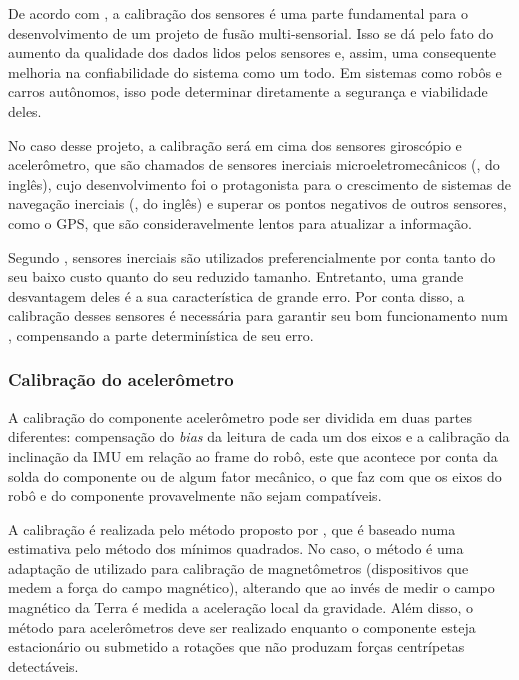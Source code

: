 \documentclass[acronym, symbols, table]{fei}
\begin{document}
		De acordo com \textcite{lv2020targetless}, a calibração dos sensores é uma parte fundamental para o desenvolvimento de um projeto de fusão multi-sensorial. Isso se dá pelo fato do aumento da qualidade dos dados lidos pelos sensores e, assim, uma consequente melhoria na confiabilidade do sistema como um todo. Em sistemas como robôs e carros autônomos, isso pode determinar diretamente a segurança e viabilidade deles.
		
		No caso desse projeto, a calibração será em cima dos sensores giroscópio e acelerômetro, que são chamados de sensores inerciais microeletromecânicos (, do inglês), cujo desenvolvimento foi o protagonista para o crescimento de sistemas de navegação inerciais (, do inglês) e superar os pontos negativos de outros sensores, como o GPS, que são consideravelmente lentos para atualizar a informação.
		
		Segundo \textcite{9181212}, sensores inerciais  são utilizados preferencialmente por conta tanto do seu baixo custo quanto do seu reduzido tamanho. Entretanto, uma grande desvantagem deles é a sua característica de grande erro. Por conta disso, a calibração desses sensores é necessária para garantir seu bom funcionamento num , compensando a parte determinística de seu erro.
		
			\subsubsection{Calibração do acelerômetro}
			
			A calibração do componente acelerômetro pode ser dividida em duas partes diferentes: compensação do \textit{bias} da leitura de cada um dos eixos e a calibração da inclinação da IMU em relação ao frame do robô, este que acontece por conta da solda do componente ou de algum fator mecânico, o que faz com que os eixos do robô e do componente provavelmente não sejam compatíveis.
			
			A calibração é realizada pelo método proposto por \textcite{menezes2020triaxial}, que é baseado numa estimativa pelo método dos mínimos quadrados. No caso, o método é uma adaptação de  utilizado para calibração de magnetômetros (dispositivos que medem a força do campo magnético), alterando que ao invés de medir o campo magnético da Terra é medida a aceleração local da gravidade. Além disso, o método para acelerômetros deve ser realizado enquanto o componente esteja estacionário ou submetido a rotações que não produzam forças centrípetas detectáveis.
			
\end{document}

